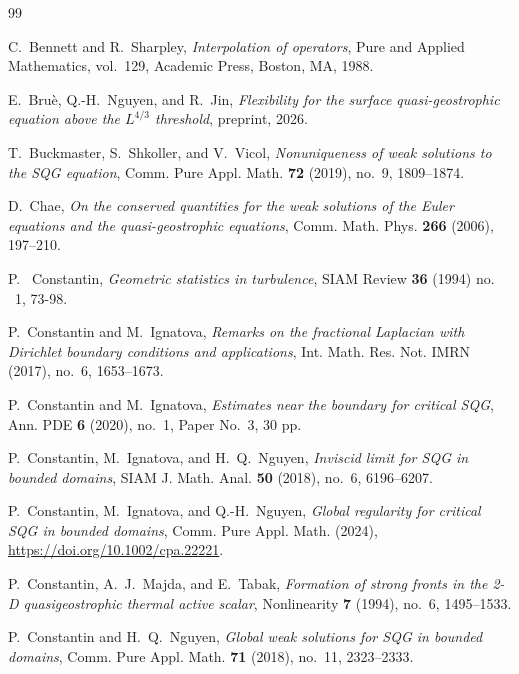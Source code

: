 \documentclass[11pt,reqno]{amsproc}
\begin{document}
\begin{thebibliography}{99}

C.~Bennett and R.~Sharpley,
\emph{Interpolation of operators},
Pure and Applied Mathematics, vol.~129, Academic Press, Boston, MA, 1988.

E.~Bru\`e, Q.-H.~Nguyen, and R.~Jin,
\emph{Flexibility for the surface quasi-geostrophic equation above the
$L^{4/3}$ threshold},
preprint, 2026.

T.~Buckmaster, S.~Shkoller, and V.~Vicol,
\emph{Nonuniqueness of weak solutions to the SQG equation},
Comm. Pure Appl. Math. \textbf{72} (2019), no.~9, 1809--1874.

D.~Chae,
\emph{On the conserved quantities for the weak solutions of the Euler
equations and the quasi-geostrophic equations},
Comm. Math. Phys. \textbf{266} (2006), 197--210.

 P. ~Constantin, \emph{Geometric statistics in turbulence}, SIAM Review \textbf{36} (1994)
 no. ~1, 73-98.

P.~Constantin and M.~Ignatova,
\emph{Remarks on the fractional Laplacian with Dirichlet boundary conditions
and applications},
Int. Math. Res. Not. IMRN (2017), no.~6, 1653--1673.

P.~Constantin and M.~Ignatova,
\emph{Estimates near the boundary for critical SQG},
Ann. PDE \textbf{6} (2020), no.~1, Paper No.~3, 30 pp.

P.~Constantin, M.~Ignatova, and H.~Q.~Nguyen,
\emph{Inviscid limit for SQG in bounded domains},
SIAM J. Math. Anal. \textbf{50} (2018), no.~6, 6196--6207.

P.~Constantin, M.~Ignatova, and Q.-H.~Nguyen,
\emph{Global regularity for critical SQG in bounded domains},
Comm. Pure Appl. Math. (2024),
\url{https://doi.org/10.1002/cpa.22221}.

P.~Constantin, A.~J.~Majda, and E.~Tabak,
\emph{Formation of strong fronts in the 2-D quasigeostrophic thermal active
scalar},
Nonlinearity \textbf{7} (1994), no.~6, 1495--1533.

P.~Constantin and H.~Q.~Nguyen,
\emph{Global weak solutions for SQG in bounded domains},
Comm. Pure Appl. Math. \textbf{71} (2018), no.~11, 2323--2333.


\end{thebibliography}
\end{document}
